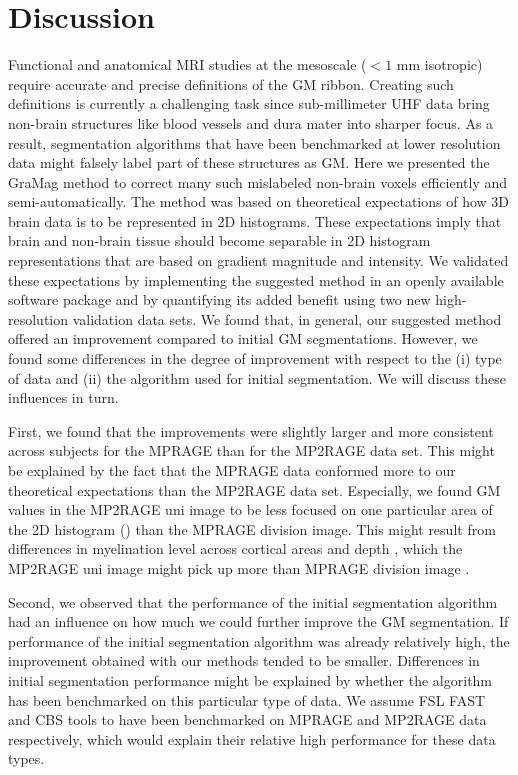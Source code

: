 \section{Discussion} \label{Discussion}
Functional and anatomical MRI studies at the mesoscale ($< 1$ mm isotropic) require accurate and precise definitions of the GM ribbon. Creating such definitions is currently a challenging task since sub-millimeter UHF data bring non-brain structures like blood vessels and dura mater into sharper focus. As a result, segmentation algorithms that have been benchmarked at lower resolution data might falsely label part of these structures as GM. Here we presented the GraMag method to correct many such mislabeled non-brain voxels efficiently and semi-automatically. The method was based on theoretical expectations of how 3D brain data is to be represented in 2D histograms. These expectations imply that brain and non-brain tissue should become separable in 2D histogram representations that are based on gradient magnitude and intensity. We validated these expectations by implementing the suggested method in an openly available software package and by quantifying its added benefit using two new high-resolution validation data sets. We found that, in general, our suggested method offered an improvement compared to initial GM segmentations. However, we found some differences in the degree of improvement with respect to the (i) type of data and (ii) the algorithm used for initial segmentation. We will discuss these influences in turn.

First, we found that the improvements were slightly larger and more consistent across subjects for the MPRAGE than for the MP2RAGE data set. This might be explained by the fact that the MPRAGE data conformed more to our theoretical expectations than the MP2RAGE data set. Especially, we found GM values in the MP2RAGE uni image to be less focused on one particular area of the 2D histogram () than the MPRAGE division image. This might result from differences in myelination level across cortical areas and depth \parencite{Sereno2013, Dick2012, DeMartino2015myelin}, which the MP2RAGE uni image might pick up more than MPRAGE division image \parencite{Marques2013}.

Second, we observed that the performance of the initial segmentation algorithm had an influence on how much we could further improve the GM segmentation. If performance of the initial segmentation algorithm was already relatively high, the improvement obtained with our methods tended to be smaller. Differences in initial segmentation performance might be explained by whether the algorithm has been benchmarked on this particular type of data. We assume FSL FAST and CBS tools to have been benchmarked on MPRAGE and MP2RAGE data respectively, which would explain their relative high performance for these data types.

